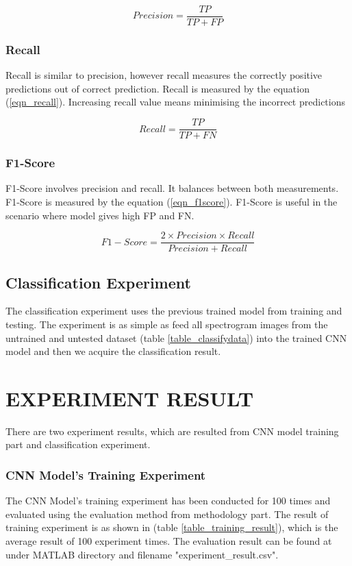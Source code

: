 \documentclass[conference]{IEEEtran}
\begin{document}
\begin{equation}
Precision = \frac{TP}{TP + FP}
\label{eqn_precision}
\end{equation}

\subsubsection{Recall}
Recall is similar to precision, however recall measures the correctly positive predictions out of correct prediction. Recall is measured by the equation (\ref{eqn_recall}). Increasing recall value means minimising the incorrect predictions

\begin{equation}
Recall = \frac{TP}{TP + FN}
\label{eqn_recall}
\end{equation}

\subsubsection{F1-Score}
F1-Score involves precision and recall. It balances between both measurements. F1-Score is measured by the equation (\ref{eqn_f1score}). F1-Score is useful in the scenario where model gives high FP and FN.

\begin{equation}
F1-Score = \frac{2 \times Precision \times Recall}{Precision + Recall}
\label{eqn_f1score}
\end{equation}

\subsection{Classification Experiment}

The classification experiment uses the previous trained model from training and testing. The experiment is as simple as feed all spectrogram images from the untrained and untested dataset (table \ref{table_classifydata}) into the trained CNN model and then we acquire the classification result.


\section{EXPERIMENT RESULT}

There are two experiment results, which are resulted from CNN model training part and classification experiment. 

\subsubsection{CNN Model's Training Experiment}
The CNN Model's training experiment has been conducted for 100 times and evaluated using the evaluation method from methodology part. The result of training experiment is as shown in (table \ref{table_training_result}), which is the average result of 100 experiment times. The evaluation result can be found at \cite{b4} under MATLAB directory and filename "experiment\_result.csv".
\end{document}
